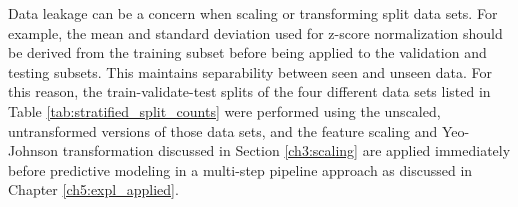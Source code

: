 Data leakage can be a concern when scaling or transforming split data sets. For example, the mean and standard deviation used for z-score normalization should be derived from the training subset before being applied to the validation and testing subsets. This maintains separability between seen and unseen data. For this reason, the train-validate-test splits of the four different data sets listed in Table \ref{tab:stratified_split_counts} were performed using the unscaled, untransformed versions of those data sets, and the feature scaling and Yeo-Johnson transformation discussed in Section \ref{ch3:scaling} are applied immediately before predictive modeling in a multi-step pipeline approach as discussed in Chapter \ref{ch5:expl_applied}.

\begin{table}[!htp]
\end{table}
